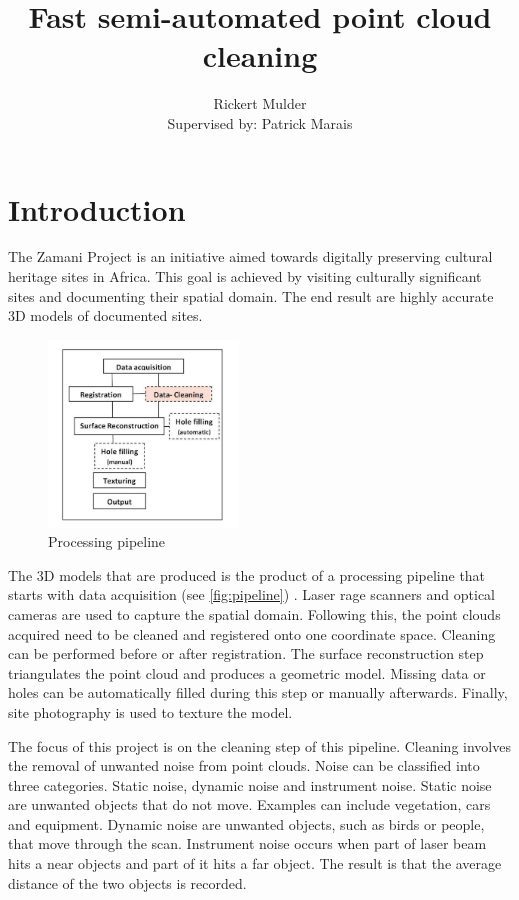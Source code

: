 \documentclass[10pt,twocolumn]{article}
\title{Fast semi-automated point cloud cleaning}
\author{Rickert Mulder\\ Supervised by: Patrick Marais}
\date{}
\begin{document}
\maketitle

\section{Introduction}
The Zamani Project is an initiative aimed towards digitally preserving cultural heritage sites in Africa. This goal is achieved by visiting culturally significant sites and documenting their spatial domain. The end result are highly accurate 3D models of documented sites.

\begin{figure}[htb]
\centering
\includegraphics[width=0.45\textwidth]{pics/pipeline.png}
\caption{Processing pipeline \cite{Ruther2011}}
\label{fig:pipeline}
\end{figure}


The 3D models that are produced is the product of a processing pipeline that starts with data acquisition (see \autoref{fig:pipeline}) \cite{Ruther2011}. Laser rage scanners and optical cameras are used to capture the spatial domain. Following this, the point clouds acquired need to be cleaned and registered onto one coordinate space. Cleaning can be performed before or after registration. The surface reconstruction step triangulates the point cloud and produces a geometric model. Missing data or holes can be automatically filled during this step or manually afterwards. Finally, site photography is used to texture the model.

The focus of this project is on the cleaning step of this pipeline. Cleaning involves the removal of unwanted noise from point clouds. Noise can be classified into three categories. Static noise, dynamic noise and instrument noise. Static noise are unwanted objects that do not move. Examples can include vegetation, cars and equipment. Dynamic noise are unwanted objects, such as birds or people, that move through the scan. Instrument noise occurs when part of laser beam hits a near objects and part of it hits a far object. The result is that the average distance of the two objects is recorded.
\end{document}
